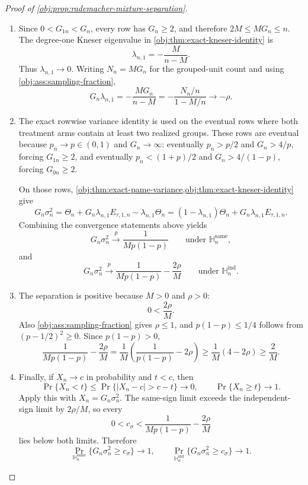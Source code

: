 \documentclass[11pt]{article}
\begin{document}
\begin{proof}[Proof of \cref{obj:prop:rademacher-mixture-separation}]
\begin{enumerate}
\item Since \(0<G_{1n}<G_n\), every row has \(G_n\ge2\), and therefore \(2M\le M G_n\le n\).  The degree-one Kneser eigenvalue in \cref{obj:thm:exact-kneser-identity} is
\[
\lambda_{n,1}=-\frac{M}{n-M}.
\]
Thus \(\lambda_{n,1}\to0\).  Writing \(N_n=M G_n\) for the grouped-unit count and using \cref{obj:ass:sampling-fraction},
\[
G_n\lambda_{n,1}
=
-\frac{M G_n}{n-M}
=
-\frac{N_n/n}{1-M/n}
\longrightarrow
-\rho .
\]

\item The exact rowwise variance identity is used on the eventual rows where both treatment arms contain at least two realized groups.  These rows are eventual because \(p_n\to p\in(0,1)\) and \(G_n\to\infty\): eventually \(p_n>p/2\) and \(G_n>4/p\), forcing \(G_{1n}\ge2\), and eventually \(p_n<(1+p)/2\) and \(G_n>4/(1-p)\), forcing \(G_{0n}\ge2\).

On those rows, \cref{obj:thm:exact-pame-variance,obj:thm:exact-kneser-identity} give
\[
G_n\sigma_n^2
=
\Theta_n+G_n\lambda_{n,1}E_{\tau,1,n}
-\lambda_{n,1}\Theta_n
=
(1-\lambda_{n,1})\Theta_n
+
G_n\lambda_{n,1}E_{\tau,1,n}.
\]
Combining the convergence statements above yields
\[
G_n\sigma_n^2
\stackrel{p}{\longrightarrow}
\frac1{M p(1-p)}
\qquad
\text{under }\mathbb H_n^{\mathrm{same}},
\]
and
\[
G_n\sigma_n^2
\stackrel{p}{\longrightarrow}
\frac1{M p(1-p)}-\frac{2\rho}{M}
\qquad
\text{under }\mathbb H_n^{\mathrm{ind}}.
\]

\item The separation is positive because \(M>0\) and \(\rho>0\):
\[
0<\frac{2\rho}{M}.
\]
Also \cref{obj:ass:sampling-fraction} gives \(\rho\le1\), and \(p(1-p)\le1/4\) follows from \((p-1/2)^2\ge0\).  Since \(p(1-p)>0\),
\[
\frac{1}{M p(1-p)}-\frac{2\rho}{M}
=
\frac1M\left(\frac1{p(1-p)}-2\rho\right)
\ge
\frac1M(4-2\rho)
\ge
\frac2M .
\]

\item Finally, if \(X_n\to c\) in probability and \(t<c\), then
\[
\Pr\{X_n<t\}
\le
\Pr\{|X_n-c|>c-t\}
\to0,
\qquad
\Pr\{X_n\ge t\}\to1.
\]
Apply this with \(X_n=G_n\sigma_n^2\).  The same-sign limit exceeds the independent-sign limit by \(2\rho/M\), so every
\[
0<c_\sigma<\frac{1}{M p(1-p)}-\frac{2\rho}{M}
\]
lies below both limits.  Therefore
\[
\Pr_{\mathbb H_n^{\mathrm{same}}}\{G_n\sigma_n^2\ge c_\sigma\}\to1,
\qquad
\Pr_{\mathbb H_n^{\mathrm{ind}}}\{G_n\sigma_n^2\ge c_\sigma\}\to1.
\]
\end{enumerate}
\end{proof}
\end{document}
